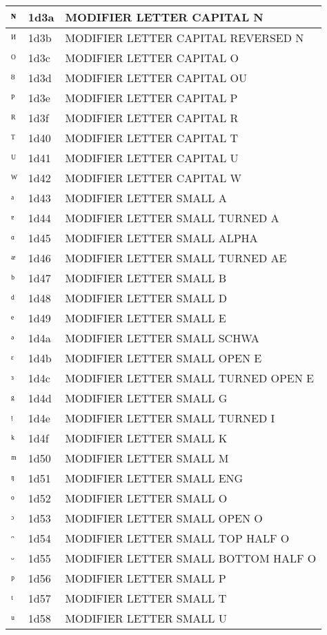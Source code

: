 \documentclass[12pt,letterpaper,openany]{book}
\begin{document}
\begin{center}
\begin{supertabular}{|m{0.25in}|m{0.5in}|m{4in}|}
ᴺ & 1d3a & MODIFIER LETTER CAPITAL N\\\hline
ᴻ & 1d3b & MODIFIER LETTER CAPITAL REVERSED N\\\hline
ᴼ & 1d3c & MODIFIER LETTER CAPITAL O\\\hline
ᴽ & 1d3d & MODIFIER LETTER CAPITAL OU\\\hline
ᴾ & 1d3e & MODIFIER LETTER CAPITAL P\\\hline
ᴿ & 1d3f & MODIFIER LETTER CAPITAL R\\\hline
ᵀ & 1d40 & MODIFIER LETTER CAPITAL T\\\hline
ᵁ & 1d41 & MODIFIER LETTER CAPITAL U\\\hline
ᵂ & 1d42 & MODIFIER LETTER CAPITAL W\\\hline
ᵃ & 1d43 & MODIFIER LETTER SMALL A\\\hline
ᵄ & 1d44 & MODIFIER LETTER SMALL TURNED A\\\hline
ᵅ & 1d45 & MODIFIER LETTER SMALL ALPHA\\\hline
ᵆ & 1d46 & MODIFIER LETTER SMALL TURNED AE\\\hline
ᵇ & 1d47 & MODIFIER LETTER SMALL B\\\hline
ᵈ & 1d48 & MODIFIER LETTER SMALL D\\\hline
ᵉ & 1d49 & MODIFIER LETTER SMALL E\\\hline
ᵊ & 1d4a & MODIFIER LETTER SMALL SCHWA\\\hline
ᵋ & 1d4b & MODIFIER LETTER SMALL OPEN E\\\hline
ᵌ & 1d4c & MODIFIER LETTER SMALL TURNED OPEN E\\\hline
ᵍ & 1d4d & MODIFIER LETTER SMALL G\\\hline
ᵎ & 1d4e & MODIFIER LETTER SMALL TURNED I\\\hline
ᵏ & 1d4f & MODIFIER LETTER SMALL K\\\hline
ᵐ & 1d50 & MODIFIER LETTER SMALL M\\\hline
ᵑ & 1d51 & MODIFIER LETTER SMALL ENG\\\hline
ᵒ & 1d52 & MODIFIER LETTER SMALL O\\\hline
ᵓ & 1d53 & MODIFIER LETTER SMALL OPEN O\\\hline
ᵔ & 1d54 & MODIFIER LETTER SMALL TOP HALF O\\\hline
ᵕ & 1d55 & MODIFIER LETTER SMALL BOTTOM HALF O\\\hline
ᵖ & 1d56 & MODIFIER LETTER SMALL P\\\hline
ᵗ & 1d57 & MODIFIER LETTER SMALL T\\\hline
ᵘ & 1d58 & MODIFIER LETTER SMALL U\\\hline

\end{supertabular}
\end{center}
\end{document}
